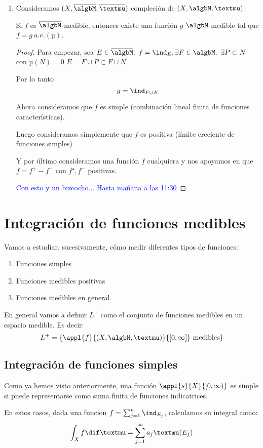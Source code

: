 \documentclass{apuntes}
\begin{document}
\begin{enumerate}
\item Consideramos $(X, \overline{\algbM}, \overline{µ})$ compleción de $(X, \algbM, µ)$.

Si $f$ es $\overline{\algbM}$-medible, entonces existe una función $g$ $\algbM$-medible tal que $f=g \ a.e.(µ)$.

\begin{proof}
Para empezar, sea $E \in \overline{\algbM}, \ f= \ind_E, \exists F \in \algbM, \ \exists P \subset N$ con $µ(N)=0$ $E=F\cup P \subset F \cup N$

Por lo tanto
\[g = \ind_{F \cup N}\]

Ahora consideramos que $f$ es simple (combinación lineal finita de funciones características).

Luego consideramos simplemente que $f$ es positiva (límite creciente de funciones simples)

Y por último consideramos una función $f$ cualquiera y nos apoyamos en que $f= f^+-f^-$ con $f⁺, f^-$ positivas.

\textcolor{blue}{Con esto y un bizcocho... Hasta mañana a las 11:30}
\end{proof}
\end{enumerate}

\chapter{Integración de funciones medibles}
Vamos a estudiar, sucesivamente, cómo medir diferentes tipos de funciones:
\begin{enumerate}
\item Funciones simples
\item Funciones medibles positivas
\item Funciones medibles en general.
\end{enumerate}

En general vamos a definir $L^+$ como el conjunto de funciones medibles en un espacio medible. Es decir:
\[L^+ = \{\appl{f}{(X, \algbM, µ)}{[0, \infty]} \text{ medibles}\}\]

\section{Integración de funciones simples}
Como ya hemos visto anteriormente, una función $\appl{s}{X}{[0, \infty)}$ es simple si puede representarse como suma finita de funciones indicatrices.

En estos casos, dada una funcion $f=\sum_{j=1}^{n}\ind_{E_j}$, calculamos su integral como:
\[\int_X f \dif µ = \sum_{j=1}^{\infty}a_jµ(E_j)\]
\end{document}
